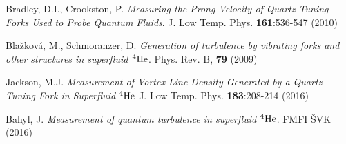 \begin{thebibliography}{99}
{\sc Bradley, D.I., Crookston, P.} 
\emph{Measuring the Prong Velocity of Quartz Tuning Forks Used to Probe Quantum Fluids}.
J. Low Temp. Phys. \textbf{161}:536-547 (2010)

{\sc Blažková, M., Schmoranzer, D.} 
\emph{Generation of turbulence by vibrating forks and other structures in superfluid $ {}^4\mathrm{He} $}.
Phys. Rev. B, \textbf{79} (2009)

{\sc Jackson, M.J.} 
\emph{Measurement of Vortex Line Density Generated by a Quartz Tuning Fork in Superfluid $ {}^4\mathrm{He} $}
J. Low Temp. Phys. \textbf{183}:208-214 (2016)

{\sc Bahyl, J.}
\emph{Measurement of quantum turbulence in superfluid $ {}^4\mathrm{He} $}.
FMFI ŠVK (2016)



\end{thebibliography}
